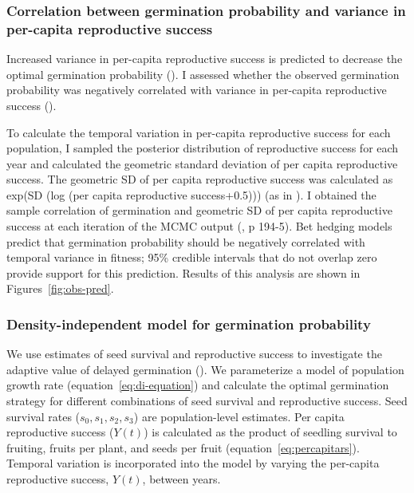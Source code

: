 \documentclass[12pt, oneside, titlepage]{article}   	%
\begin{document}
{%

\subsubsection{Correlation between germination probability and variance in per-capita reproductive success}

Increased variance in per-capita reproductive success is predicted to decrease the optimal germination probability (\cite{cohen1966,ellner1985a}). I assessed whether the observed germination probability was negatively correlated with variance in per-capita reproductive success (\cite{venable2007}).

To calculate the temporal variation in per-capita reproductive success for each population, I sampled the posterior distribution of reproductive success for each year and calculated the geometric standard deviation of per capita reproductive success. The geometric SD of per capita reproductive success was calculated as exp(SD (log (per capita reproductive success+0.5))) (as in \cite{venable2007}). I obtained the sample correlation of germination and geometric SD of per capita reproductive success at each iteration of the MCMC output (\cite{hobbs2015b}, p 194-5). Bet hedging models predict that germination probability should be negatively correlated with temporal variance in fitness; 95\% credible intervals that do not overlap zero provide support for this prediction. Results of this analysis are shown in Figures~\ref{fig:obs-pred}.


\subsubsection{Density-independent model for germination probability}

We use estimates of seed survival and reproductive success to investigate the adaptive value of delayed germination (\cite{gremer2014}). We parameterize a model of population growth rate (equation~\ref{eq:di-equation}) and calculate the optimal germination strategy for different combinations of seed survival and reproductive success. Seed survival rates ($s_0, s_1, s_2, s_3$) are population-level estimates. Per capita reproductive success ($Y(t)$) is calculated as the product of seedling survival to fruiting, fruits per plant, and seeds per fruit (equation~\eqref{eq:percapitars}). Temporal variation is incorporated into the model by varying the per-capita reproductive success, $Y(t)$, between years.

}
\end{document}

